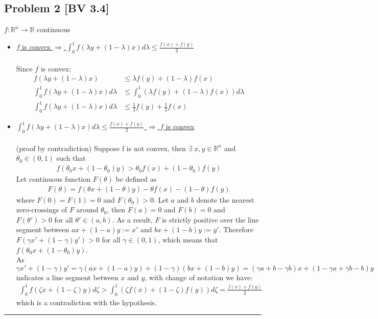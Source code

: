 \documentclass[12pt, letterpaper, twoside]{article}
\newcommand{\R}{\mathbb{R}}
\begin{document}
\subsection*{Problem 2 \small[BV 3.4]}
$f:\R^n\rightarrow\R$ continuous
\begin{itemize}[label={}]
    \item {\color{cyan}\fbox{$\Rightarrow$}} 
    \underline{$f$ is convex $\Rightarrow$ $\int_0^1f(\lambda y +(1-\lambda)x)d\lambda\leq\frac{f(x)+f(y)}{2}$}\\\\
    Since $f$ is convex:
    \begin{align*}
        f(\lambda y +(1-\lambda)x)&\leq \lambda f(y) + (1-\lambda) f(x)\\
        \int_0^1f(\lambda y +(1-\lambda)x)d\lambda&\leq \int_0^1(\lambda f(y) + (1-\lambda) f(x))d\lambda\\
        \int_0^1f(\lambda y +(1-\lambda)x)d\lambda&\leq \frac{1}{2} f(y) + \frac{1}{2} f(x)
    \end{align*}
    
    \item {\color{cyan}\fbox{$\Leftarrow$}} 
    \underline{$\int_0^1f(\lambda y +(1-\lambda)x)d\lambda\leq\frac{f(x)+f(y)}{2}$ $\Rightarrow$ $f$ is convex}\\\\
    (proof by contradiction) Suppose f is not convex, then $\exists\; x,y\in\R^n$ and $\theta_0\in(0,1)$ such that 
    \begin{align*}
        f(\theta_0 x + (1-\theta_0) y)>\theta_0 f(x) + (1-\theta_0) f(y)
    \end{align*}
    Let continuous function $F(\theta)$ be defined as
    \begin{align*}
        F(\theta)=f(\theta x + (1-\theta) y)-\theta f(x)-(1-\theta) f(y)
    \end{align*}
    where $F(0)=F(1)=0$ and $F(\theta_0)>0$. Let $a$ and $b$ denote the nearest zero-crossings of $F$ around $\theta_0$, then $F(a)=0$ and $F(b)=0$ and $F(\theta')>0$ for all $\theta'\in(a,b)$. As a result, $F$ is strictly positive over the line segment between $ax+(1-a)y:=x'$ and $bx+(1-b)y:=y'$. Therefore $F(\gamma x' + (1-\gamma)y')>0$ for all $\gamma\in(0,1)$, which means that $f(\theta_0 x + (1-\theta_0) y)$.\\
    As $\gamma x' + (1-\gamma)y'=\gamma(ax+(1-a)y)+(1-\gamma)(bx+(1-b)y)=(\gamma a+b-\gamma b)x+(1-\gamma a+\gamma b -b)y$ indicates a line segment between $x$ and $y$, with change of notation we have:
    \begin{align*}
        \int_0^1f(\zeta x+(1-\zeta)y)d\zeta>\int_0^1(\zeta f(x)+(1-\zeta)f(y))d\zeta=\frac{f(x)+f(y)}{2}
    \end{align*}
    which is a contradiction with the hypothesis.
\end{itemize}
\hrule
\end{document}

